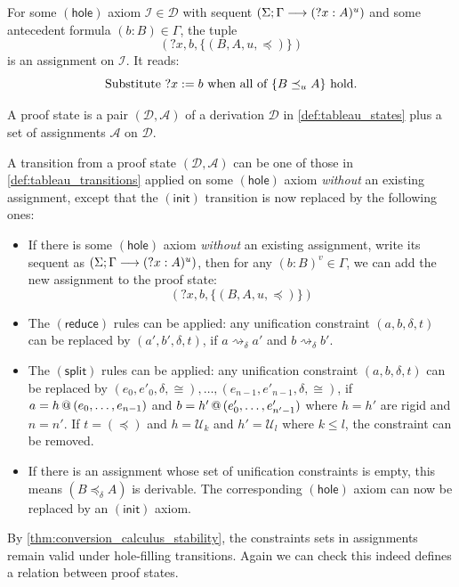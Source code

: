 \documentclass[twoside]{report}
\begin{document}
\begin{example}
    For some $(\mathsf{hole})$ axiom $\mathcal I \in \mathcal D$ with sequent $(\Sigma; \Gamma \longrightarrow ({?x} : A)^u)$ and some antecedent formula $(b : B) \in \Gamma$, the tuple
    $$({?x}, b, \{(B, A, u, \preceq)\})$$
    is an assignment on $\mathcal I$. It reads:
    $$\text{Substitute } {?x} := b \text{ when all of } \{B \preceq_u A\} \text{ hold.}$$
\end{example}

\begin{definition}
    \label{def:tableau_states_with_constraints}
    A proof state is a pair $(\mathcal D, \mathcal A)$ of a derivation $\mathcal D$ in \cref{def:tableau_states} plus a set of assignments $\mathcal A$ on $\mathcal D$.
\end{definition}

\begin{definition}
    \label{def:tableau_transitions_with_constraints}
    A transition from a proof state $(\mathcal D, \mathcal A)$ can be one of those in \cref{def:tableau_transitions} applied on some $(\mathsf{hole})$ axiom \emph{without} an existing assignment, except that the $(\mathsf{init})$ transition is now replaced by the following ones:
    \begin{itemize}
        \item If there is some $(\mathsf{hole})$ axiom \emph{without} an existing assignment, write its sequent as $(\Sigma; \Gamma \longrightarrow ({?x} : A)^u)$, then for any $(b : B)^v \in \Gamma$, we can add the new assignment to the proof state:
              $$({?x}, b, \{(B, A, u, \preceq)\})$$

        \item The $(\mathsf{reduce})$ rules can be applied: any unification constraint $(a, b, \delta, t)$ can be replaced by $(a', b', \delta, t)$, if $a \rightsquigarrow_\delta a'$ and $b \rightsquigarrow_\delta b'$.

        \item The $(\mathsf{split})$ rules can be applied: any unification constraint $(a, b, \delta, t)$ can be replaced by $(e_0, e'_0, \delta, \cong), \ldots, (e_{n-1}, e'_{n-1}, \delta, \cong)$, if $a = {h}\,@\,({e_0, \ldots, e_{n-1}})$ and $b = {h'}\,@\,({e'_0, \ldots, e'_{n'-1}})$ where $h = h'$ are rigid and $n = n'$. If $t = (\preceq)$ and $h = \mathcal U_k$ and $h' = \mathcal U_l$ where $k \leq l$, the constraint can be removed.

        \item If there is an assignment whose set of unification constraints is empty, this means $(B \preceq_\delta A)$ is derivable. The corresponding $(\mathsf{hole})$ axiom can now be replaced by an $(\mathsf{init})$ axiom.
    \end{itemize}
    By \cref{thm:conversion_calculus_stability}, the constraints sets in assignments remain valid under hole-filling transitions. Again we can check this indeed defines a relation between proof states.
\end{definition}
\end{document}
